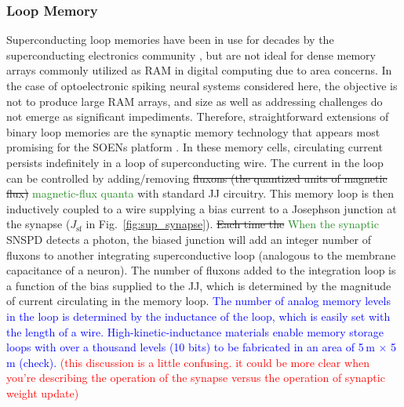 \documentclass[twocolumn]{article}
\begin{document}
\subsubsection{Loop Memory}\label{Loops}
Superconducting loop memories have been in use for decades by the superconducting electronics community \cite{vatu1998,ka1999}, but are not ideal for dense memory arrays commonly utilized as RAM in digital computing due to area concerns. In the case of optoelectronic spiking neural systems considered here, the objective is not to produce large RAM arrays, and size as well as addressing challenges do not emerge as significant impediments. Therefore, straightforward extensions of binary loop memories are the synaptic memory technology that appears most promising for the SOENs platform \cite{sh2018,shainline2019superconducting}. In these memory cells, circulating current persists indefinitely in a loop of superconducting wire. The current in the loop can be controlled by adding/removing \sout{fluxons (the quantized units of magnetic flux)} \textcolor{ForestGreen}{magnetic-flux quanta} with standard JJ circuitry. This memory loop is then inductively coupled to a wire supplying a bias current to a Josephson junction at the synapse ($J_{\mathrm{sf}}$ in Fig.\, \ref{fig:sup_synapse}). \sout{Each time the} \textcolor{ForestGreen}{When the synaptic} SNSPD detects a photon, the biased junction will add an integer number of fluxons to another integrating superconductive loop (analogous to the membrane capacitance of a neuron). The number of fluxons added to the integration loop is a function of the bias supplied to the JJ, which is determined by the magnitude of current circulating in the memory loop. \textcolor{blue}{The number of analog memory levels in the loop is determined by the inductance of the loop, which is easily set with the length of a wire. High-kinetic-inductance materials \cite{tobo2018} enable memory storage loops with over a thousand levels (10 bits) to be fabricated in an area of 5\,\textmu m $\times$ 5\,\textmu m (check).} \textcolor{red}{(this discussion is a little confusing. it could be more clear when you're describing the operation of the synapse versus the operation of synaptic weight update)}
\end{document}
